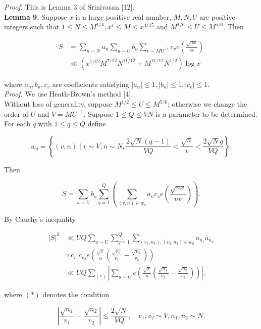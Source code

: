 \documentclass[10pt]{article}
\begin{document}
\smallskip\noindent\textit{Proof.} This is Lemma 3 of Srinivasan [12].\\
\medskip\noindent\textbf{Lemma 9.} Suppose $x$ is a large positive real number, $M, N, U$ are positive integers such that $1 \leq N \leq M^{1 / 4}, x^{\varepsilon} \leq M \leq x^{4 / 15}$ and $M^{1 / 6} \leq U \leq M^{5 / 6}$. Then


\begin{align*}
S & =\sum_{n \sim N} a_{n} \sum_{u \sim U} b_{u} \sum_{v \sim M U^{-1}} c_{v} e\left(\frac{\sqrt{n x}}{u v}\right)  \tag{2.1}\\
& \ll\left(x^{1 / 12} M^{7 / 12} N^{11 / 12}+M^{11 / 12} N^{1 / 2}\right) \log x
\end{align*}


where $a_{n}, b_{u}, c_{v}$ are coefficients satisfying $\left|a_{n}\right| \leq 1,\left|b_{u}\right| \leq 1,\left|c_{v}\right| \leq 1$.\\[0pt]
\smallskip\noindent\textit{Proof.} We use Heath-Brown's method [4].\\
Without loss of generality, suppose $M^{1 / 2} \leq U \leq M^{5 / 6}$; otherwise we change the order of $U$ and $V=M U^{-1}$. Suppose $1 \leq Q \leq V N$ is a parameter to be determined. For each $q$ with $1 \leq q \leq Q$ define

$$
w_{q}=\left\{(v, n) \mid v \sim V, n \sim N, \frac{2 \sqrt{N}(q-1)}{V Q}<\frac{\sqrt{n}}{v}<\frac{2 \sqrt{N} q}{V Q}\right\}.
$$

Then

$$
S=\sum_{u \sim U} b_{u} \sum_{q=1}^{Q}\left(\sum_{(v, n) \in w_{q}} a_{n} c_{v} e\left(\frac{\sqrt{n x}}{u v}\right)\right).
$$

By Cauchy's inequality


\begin{align*}
|S|^{2} & \ll U Q \sum_{u \sim U} \sum_{q=1}^{Q} \sum_{\left(v_{1}, n_{1}\right),\left(v_{2}, n_{2}\right) \in w_{q}} a_{n_{1}} \bar{a}_{n_{2}}  \tag{2.2}\\
& \times c_{v_{1}} \bar{c}_{v_{2}} e\left(\frac{\sqrt{x}}{u}\left(\frac{\sqrt{n_{1}}}{v_{1}}-\frac{\sqrt{n_{2}}}{v_{2}}\right)\right) \\
& \ll U Q \sum_{(*)}\left|\sum_{u \sim U} e\left(\frac{\sqrt{x}}{u}\left(\frac{\sqrt{n_{1}}}{v_{1}}-\frac{\sqrt{n_{2}}}{v_{2}}\right)\right)\right|,
\end{align*}


where $(*)$ denotes the condition


\begin{equation*}
\left|\frac{\sqrt{n_{1}}}{v_{1}}-\frac{\sqrt{n_{2}}}{v_{2}}\right| \leq \frac{2 \sqrt{N}}{V Q}, \quad v_{1}, v_{2} \sim V, n_{1}, n_{2} \sim N . \tag{2.3}
\end{equation*}
\end{document}
